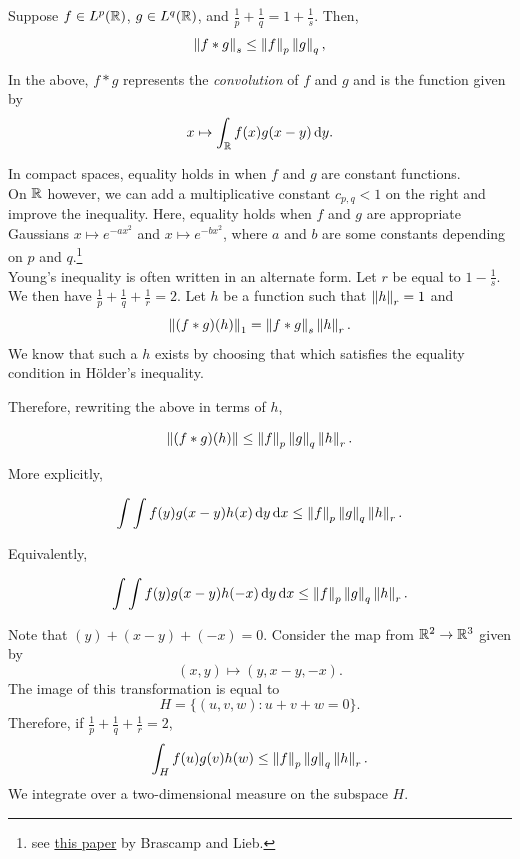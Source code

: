 \begin{theorem}
\label{young's convolution inequality}
Suppose $f\in L^p(\mathbb{R})$, $g\in L^q(\mathbb{R})$, and $\frac{1}{p} + \frac{1}{q} = 1 + \frac{1}{s}$. Then,
\begin{equation}
\label{eqn young's convolution inequality}
    \left\lVert f * g\right\rVert_s \leq \left\lVert f\right\rVert_p \left\lVert g\right\rVert_q,
\end{equation}
\end{theorem}

In the above, $f * g$ represents the \textit{convolution} of $f$ and $g$ and is the function given by
\[ x \mapsto \int_{\mathbb{R}} f(x) g(x-y) \operatorname{d}\!{y}. \]

In compact spaces, equality holds in  when $f$ and $g$ are constant functions.\\
On $\mathbb{R}$ however, we can add a multiplicative constant $c_{p,q}<1$ on the right and improve the inequality. Here, equality holds when $f$ and $g$ are appropriate Gaussians $x\mapsto e^{-a x^2}$ and $x\mapsto e^{-b x^2}$, where $a$ and $b$ are some constants depending on $p$ and $q$.\footnote{see \href{https://www.sciencedirect.com/science/article/pii/0001870876901845}{this paper} by Brascamp and Lieb.} \\
Young's inequality is often written in an alternate form. Let $r$ be equal to $1-\frac{1}{s}$. We then have $\frac{1}{p} + \frac{1}{q} + \frac{1}{r} = 2$. Let $h$ be a function such that $\left\lVert h\right\rVert_r=1$ and
\[ \left\lVert(f*g)(h)\right\rVert_1 = \left\lVert f*g\right\rVert_s \left\lVert h\right\rVert_r. \]
We know that such a $h$ exists by choosing that which satisfies the equality condition in H\"older's inequality.

Therefore, rewriting the above in terms of $h$,

\[ \left\lVert(f*g)(h)\right\rVert \leq \left\lVert f\right\rVert_p \left\lVert g\right\rVert_q \left\lVert h\right\rVert_r. \]

More explicitly,

\[ \int \int f(y) g(x-y) h(x) \operatorname{d}\!{y} \operatorname{d}\!{x} \leq \left\lVert f\right\rVert_p \left\lVert g\right\rVert_q \left\lVert h\right\rVert_r. \]

Equivalently,

\[ \int \int f(y) g(x-y) h(-x) \operatorname{d}\!{y} \operatorname{d}\!{x} \leq \left\lVert f\right\rVert_p \left\lVert g\right\rVert_q \left\lVert h\right\rVert_r. \]

Note that $(y) + (x-y) + (-x) = 0$. Consider the map from $\mathbb{R}^2\to \mathbb{R}^3$ given by
\[ (x,y) \mapsto (y,x-y,-x). \]
The image of this transformation is equal to
\[ H = \{(u,v,w):u+v+w=0\}. \]
Therefore, if $\frac{1}{p} + \frac{1}{q} + \frac{1}{r} = 2$,
\[ \int_H f(u)g(v)h(w) \leq \left\lVert f\right\rVert_p \left\lVert g\right\rVert_q \left\lVert h\right\rVert_r. \]
We integrate over a two-dimensional measure on the subspace $H$.\\

